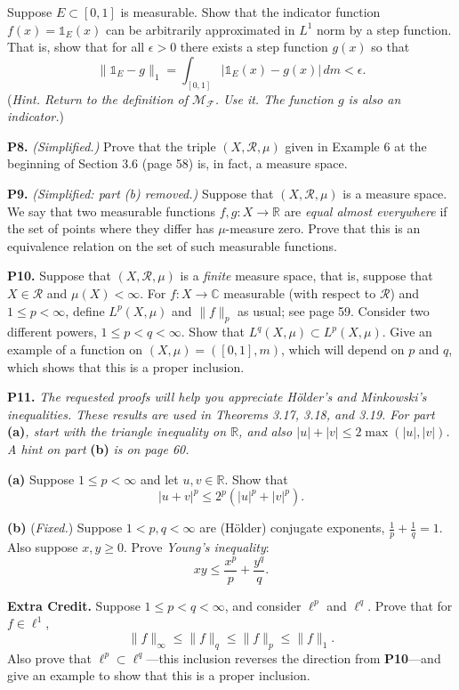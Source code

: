 \documentclass[12pt]{amsart}
\newcommand{\cF}{\mathcal{F}}
\newcommand{\cM}{\mathcal{M}}
\newcommand{\cR}{\mathcal{R}}
\newcommand{\CC}{\mathbb{C}}
\newcommand{\RR}{\mathbb{R}}
\newcommand{\eps}{\epsilon}
\newcommand{\one}{\mathds{1}}
\newcommand{\prob}[1]{\bigskip\noindent\textbf{#1.}\quad }
\newcommand{\epart}[1]{\medskip\noindent\textbf{(#1)}\quad }
\begin{document}
\medskip \noindent Suppose $E\subset [0,1]$ is measurable.  Show that the indicator function $f(x)=\one_E(x)$ can be arbitrarily approximated in $L^1$ norm by a step function.  That is, show that for all $\eps>0$ there exists a step function $g(x)$ so that
	$$\|\one_E-g\|_1 = \int_{[0,1]} |\one_E(x) - g(x)|\,dm < \eps.$$
(\emph{Hint. Return to the definition of $\cM_{\cF}$.  Use it.  The function $g$ is also an indicator.})


\prob{P8}  {\color{red} \emph{(Simplified.)}}  Prove that the triple $(X,\cR,\mu)$ given in Example 6 at the beginning of Section 3.6 (page 58) is, in fact, a measure space.


\prob{P9} {\color{red} \emph{(Simplified: part (b) removed.)}}  Suppose that $(X,\cR,\mu)$ is a measure space.  We say that two measurable functions $f,g:X\to\RR$ are \emph{equal almost everywhere} if the set of points where they differ has $\mu$-measure zero.  Prove that this is an equivalence relation on the set of such measurable functions.


\prob{P10}  Suppose that $(X,\cR,\mu)$ is a \emph{finite} measure space, that is, suppose that $X\in\cR$ and $\mu(X)<\infty$.  For $f:X\to\CC$ measurable (with respect to $\cR$) and $1\le p<\infty$, define $L^p(X,\mu)$ and $\|f\|_p$ as usual; see page 59.  Consider two different powers, $1\le p<q<\infty$.  Show that $L^q(X,\mu) \subset L^p(X,\mu)$.  Give an example of a function on $(X,\mu)=([0,1],m)$, which will depend on $p$ and $q$, {\color{red} which shows that} this is a proper inclusion.


\prob{P11}  \emph{The requested proofs will help you appreciate H\"older's and Minkowski's inequalities.  These results are used in Theorems 3.17, 3.18, and 3.19.  For part} \textbf{(a)}\emph{, start with the triangle inequality on $\RR$, and also $|u|+|v| \le 2\max(|u|,|v|)$.  A hint on part} \textbf{(b)} \emph{is on page 60.}

\epart{a} Suppose $1\le p<\infty$ and let $u,v\in\RR$.  Show that
	$$|u+v|^p \le 2^p \left(|u|^p + |v|^p\right).$$

\epart{b} {\color{red} (\emph{Fixed.})}  Suppose $1 < p,q<\infty$ are (H\"older) conjugate exponents, $\frac{1}{p} + \frac{1}{q} = 1$.  Also suppose $x,y\ge 0$.  Prove \emph{Young's inequality}:
	$$xy \le \frac{x^p}{p} + \frac{y^q}{q}.$$


\medskip
\prob{Extra Credit}  Suppose $1\le p < q < \infty$, and consider $\ell^p$ and $\ell^q$.  Prove that for $f\in \ell^1$,
	$$\|f\|_\infty \le \|f\|_q \le \|f\|_p \le \|f\|_1.$$
Also prove that $\ell^p \subset \ell^q$---this inclusion reverses the direction from \textbf{P10}---and give an example to show that this is a proper inclusion.
\end{document}
